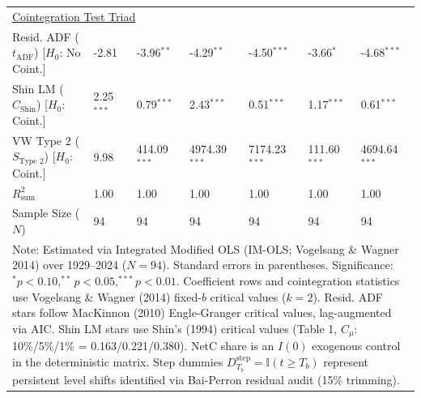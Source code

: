 \begin{table}[H]
\begin{tabular}{p{3.8cm}p{2.1cm}p{2.1cm}p{2.1cm}p{2.1cm}p{2.1cm}p{2.1cm}}
\midrule
\multicolumn{7}{l}{\underline{Cointegration Test Triad}} \\
\makecell[l]{Resid. ADF ($t_{\text{ADF}}$) \\ {\scriptsize [$H_0$: No Coint.]}} & -2.81 & -3.96$^{**}$ & -4.29$^{**}$ & -4.50$^{***}$ & -3.66$^{*}$ & -4.68$^{***}$  \\
\makecell[l]{Shin LM ($C_{\text{Shin}}$) \\ {\scriptsize [$H_0$: Coint.]}} & 2.25$^{***}$ & 0.79$^{***}$ & 2.43$^{***}$ & 0.51$^{***}$ & 1.17$^{***}$ & 0.61$^{***}$  \\
\makecell[l]{VW Type 2 ($S_{\text{Type 2}}$) \\ {\scriptsize [$H_0$: Coint.]}} & 9.98 & 414.09$^{***}$ & 4974.39$^{***}$ & 7174.23$^{***}$ & 111.60$^{***}$ & 4694.64$^{***}$  \\
\midrule
$R^2_{\text{sum}}$ & 1.00 & 1.00 & 1.00 & 1.00 & 1.00 & 1.00  \\
Sample Size ($N$) & 94 & 94 & 94 & 94 & 94 & 94  \\
\bottomrule
\multicolumn{7}{p{16.5cm}}{\footnotesize Note: Estimated via Integrated Modified OLS (IM-OLS; Vogelsang \& Wagner 2014) over 1929--2024 ($N=94$). Standard errors in parentheses. Significance: $^*p<0.10, ^{**}p<0.05, ^{***}p<0.01$. Coefficient rows and cointegration statistics use Vogelsang \& Wagner (2014) fixed-$b$ critical values ($k=2$). Resid. ADF stars follow MacKinnon (2010) Engle-Granger critical values, lag-augmented via AIC. Shin LM stars use Shin's (1994) critical values (Table 1, $C_\mu$: 10\%/5\%/1\% = 0.163/0.221/0.380). NetC share is an $I(0)$ exogenous control in the deterministic matrix. Step dummies $D^{\text{step}}_{T_b} = \mathbb{I}(t \ge T_b)$ represent persistent level shifts identified via Bai-Perron residual audit (15\% trimming).}
\end{tabular}
\end{table}
